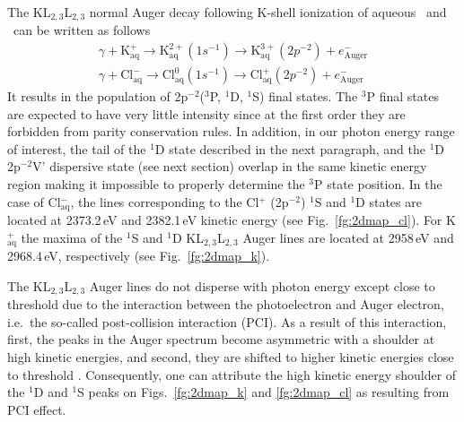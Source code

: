 The KL$_{2,3}$L$_{2,3}$ normal Auger decay following K-shell ionization of aqueous \ki~and \cli~can be written as follows
%
\begin{align*}
\gamma + \text{K}^{+}_{\text{aq}} \rightarrow \text{K}^{2+}_{\text{aq}} (1s^{-1}) \rightarrow \text{K}^{3+}_{\text{aq}} (2p^{-2}) + e^{-}_{\text{Auger}}\\
\gamma + \text{Cl}^{-}_{\text{aq}} \rightarrow \text{Cl}^{0}_{\text{aq}} (1s^{-1}) \rightarrow \text{Cl}^{+}_{\text{aq}}(2p^{-2}) + e^{-}_{\text{Auger}}
\end{align*}
%
It results in the population of 2p$^{-2}$($^3$P, $^1$D, $^1$S) final states. 
The $^3$P final states are expected to have very little intensity since at the first order they are forbidden from parity conservation rules. In addition, in our photon energy range of interest, the tail of the $^1$D state described in the next paragraph, and the $^1$D 2p$^{-2}$V' dispersive state (see next section) overlap in the same kinetic energy region making it impossible to properly determine the $^3$P state position.  
In the case of Cl$^{-}_{\text{aq}}$, the lines corresponding to the Cl$^{+}$ (2p$^{-2}$) $^1$S and $^1$D states are located at 2373.2\,eV and 2382.1\,eV kinetic energy (see Fig.\ \ref{fg:2dmap_cl}). For K$^{+}_{\text{aq}}$ the maxima of the $^1$S and $^1$D KL$_{2,3}$L$_{2,3}$ Auger lines are located at 2958\,eV and 2968.4\,eV, respectively (see Fig.\ \ref{fg:2dmap_k}). 


The KL$_{2,3}$L$_{2,3}$ Auger lines do not disperse with photon energy except close to threshold due to the interaction between the photoelectron and Auger electron, i.e.\ the so-called post-collision interaction (PCI). As a result of this interaction, first, the peaks in the Auger spectrum become asymmetric with a shoulder at high kinetic energies, and second, they are shifted to higher kinetic energies close to threshold \citep{russek86:911,guillemin15:012503}. Consequently, one can attribute the high kinetic energy shoulder of the $^1$D and $^1$S peaks on Figs.\ \ref{fg:2dmap_k} and \ref{fg:2dmap_cl} as resulting from PCI effect.


